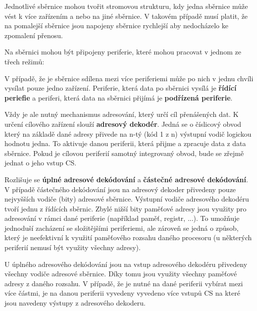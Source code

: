 \vskip 4mm
\vskip 4mm

Jednotlivé sběrnice mohou tvořit stromovou strukturu, kdy jedna sběrnice může vést k více zařízením a nebo na jiné sběrnice. V takovém případě musí platit, že na pomalejší sběrnice jsou napojeny sběrnice rychlejší aby nedocházelo ke zpomalení přenosu. 

Na sběrnici mohou být připojeny periferie, které mohou pracovat v jednom ze třech režimů:

\vskip 4mm
\vskip 4mm

V případě, že je sběrnice sdílena mezi více periferiemi může po nich v jednu chvíli vysílat pouze jedno zařízení. Periferie, která data po sběrnici vysílá je {\bf řídící periefie} a periferi, která data na sběrnici přijímá je {\bf podřízená periferie}.


Vždy je ale nutný mechanismus adresování, který určí cíl přenášených dat. K určení cílového zařízení slouží {\bf adresový dekodér}. Jedná se o číslicový obvod který na základě dané adresy přivede na n-tý (kód 1 z n) výstupní vodič logickou hodnotu jedna. To aktivuje danou periferii, která přijme a zpracuje data z data sběrnice. Pokud je cílovou periferií samotný integrovaný obvod, bude se zřejmě jednat o jeho vstup CS.

Rozlišuje se {\bf úplné adresové dekódování} a {\bf částečné adresové dekódování}.  V případě částečného dekódování jsou na adresový dekoder přivedeny pouze nejvyšších vodiče (bity) adresové sběrnice. Výstupní vodiče adresového dekodéru tvoří jednu z řídících sběrnic.  Zbylé nižší bity paměťové adresy jsou využity pro adresování v rámci dané periferie (například paměť, registr, ...). To umožňuje jednoduší zacházení se složitějšími periferiemi, ale zároveň se jedná o způsob, který je neefektivní k využití paměťového rozsahu daného procesoru (u některých periferií nemusí být využity všechny adresy).

U úplného adresového dekódování jsou na vstup adresového dekodéru přivedeny všechny vodiče adresové sběrnice. Díky tomu jsou využity všechny paměťové adresy z daného rozsahu. V případě, že je nutné na dané periferii vybírat mezi více částmi, je na danou periferii vyvedeny vyvedeno více vstupů CS na které jsou navedeny výstupy z adresového dekoderu.

